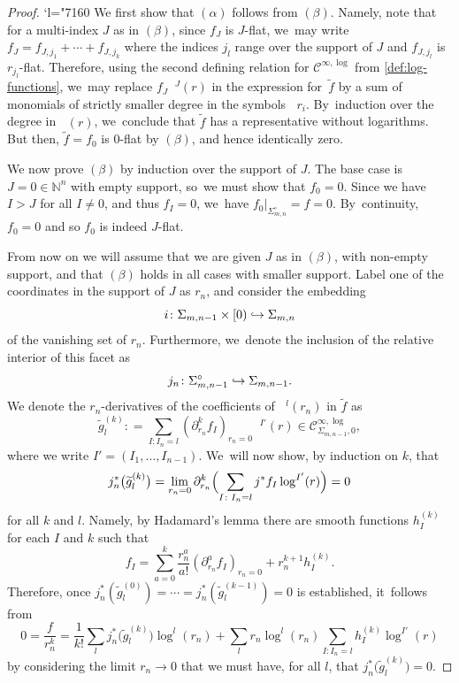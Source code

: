 \documentclass[10pt]{amsart}
\newcommand{\Changel}{\mathcode`l="7160}
\newcommand\hto{\mathrel{\lhook\joinrel\to}}
\newcommand{\rBrac}[1]{\Bigl(#1\Bigr)}
\theoremstyle{definition}
\theoremstyle{remark}
\newcommand{\NN}{\mathbb{N}}
\newcommand{\ulog}{\mathop{\widetilde{\log}}\nolimits}
\newcommand{\uf}{\widetilde{f}}
\newcommand{\ug}{\widetilde{g}}
\newcommand{\defas}{\mathrel{\mathop:}=}
\newcommand{\Cinflog}[1]{\mathscr{C}^{\infty,\log}_{#1}}
\newcommand{\cvf}[1]{\partial_{#1}}
\newcommand{\Sig}{\Sigma}
\newcommand{\intSig}{\Sigma^\circ}
\begin{document}
\begin{proof}\Changel
We first show that $(\alpha)$ follows from $(\beta)$. Namely, note that for a multi-index $J$ as in $(\beta)$, since $f_{J}$ is $J$-flat, we~may write $f_{J} = f_{J,j_1} + \cdots + f_{J,j_k}$ where the indices $j_l$ range over the support of $J$ and $f_{J,j_l}$ is $r_{j_l}$-flat.
Therefore, using the second defining relation for $\Cinflog{}$ from \autoref{def:log-functions}, we~may replace $f_{J}\ulog{}\!^J(r)$ in the expression for~$\uf$ by a sum of monomials of strictly smaller degree in the symbols $\ulog r_i$. By~induction over the degree in $\ulog(r)$, we~conclude that $\uf$ has a representative without logarithms. But then, $\uf=f_0$ is $0$-flat by $(\beta)$, and hence identically zero.

We now prove $(\beta)$ by induction over the support of $J$. The base case is $J=0\in\NN^n$ with empty support, so~we must show that $f_0=0$. Since we have $I>J$ for all $I\neq 0$, and thus $f_I=0$, we~have $f_0|_{\intSig_{m,n}}=f=0$. By~continuity, $f_0=0$ and so $f_0$ is indeed $J$-flat.

From now on we will assume that we are given $J$ as in $(\beta)$, with non-empty support, and that $(\beta)$ holds in all cases with smaller support. Label one of the coordinates in the support of $J$ as $r_n$, and consider the embedding
\[
i\colon \Sig_{m,n-1} \times [0) \hto \Sig_{m,n}
\]
of the vanishing set of $r_n$. Furthermore, we~denote the inclusion of the relative interior of this facet as
\begin{equation*}
j_n \colon \intSig_{m,n-1}
\hto \Sig_{m,n-1}
.
\end{equation*}
We denote the $r_n$-derivatives of the coefficients of $\ulog{}\!^l(r_n)$ in $\uf$ as
\begin{equation}\label{eq:r_n-expansion}
\ug_l^{(k)} \defas \sum_{I\colon I_n=l} \left(\cvf{r_n}^k f_{I}\right)_{r_n=0} \ulog{}\!^{I'}(r)
\in \Cinflog{\Sig_{m,n-1},0},
\end{equation}
where we write $I'=(I_1,\ldots,I_{n-1})$. We~will now show, by induction on $k$, that
\begin{equation*}
j_n^* \bigl(\ug_l^{(k)} \bigr)
=\lim_{r_n=0} \cvf{r_n}^k \rBrac{\sum_{I\colon I_n=l} j^*f_I \log^{I'}(r)}
= 0
\end{equation*}
for all $k$ and $l$. Namely, by Hadamard's lemma there are smooth functions $h_I^{(k)}$ for each $I$ and $k$ such that\vspace*{-3pt}
\begin{equation*}
f_I=\sum_{a=0}^{k} \frac{r_n^a}{a!} \left(\cvf{r_n}^a f_I \right)_{r_n=0}
+r_n^{k+1} h_I^{(k)}.
\end{equation*}
Therefore, once $j_n^*(\ug_l^{(0)})=\cdots=j_n^*(\ug_l^{(k-1)})=0$ is established, it~follows from\vspace*{-3pt}
\begin{equation*}
0 = \frac{f}{r_n^k} = \frac{1}{k!}\sum_l j_n^*\bigl(\ug_l^{(k)}\bigr) \log^l(r_n) + \sum_l r_n \log^l(r_n) \sum_{I\colon I_n=l} h_I^{(k)} \log^{I'}(r)
\end{equation*}
by considering the limit $r_n\rightarrow 0$ that we must have, for all $l$, that $j_n^*\big(\ug_l^{(k)}\big)=0$.


\end{proof}
\end{document}

